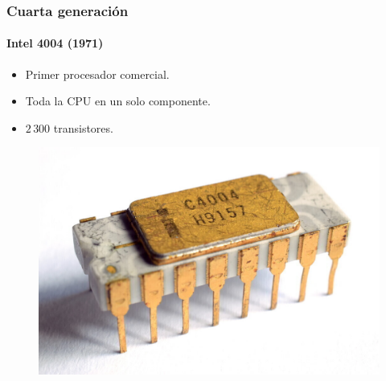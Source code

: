 \documentclass[11pt,a4paper,spanish]{beamer}
\begin{document}
\begin{frame}

\frametitle{Cuarta generación}
\framesubtitle{Intel 4004 (1971)}

\begin{itemize}
    \item Primer procesador comercial.
    \item Toda la CPU en un solo componente.
    \item $2\,300$ transistores.
\end{itemize}

\begin{figure}
    \includegraphics[height=0.5\textheight]{img/intelC4004.jpg}
    \captionsetup{textfont=tiny,labelformat=empty}
    \caption{\ccbysa\cite{intelC4004}}
\end{figure}

\end{frame}
\end{document}
